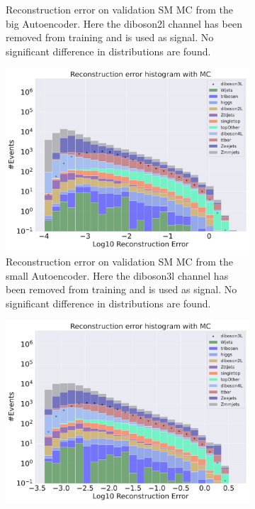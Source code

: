 \begin{figure}[H]
\begin{subfigure}{.45\textwidth}
        \caption{Reconstruction error on validation SM MC from the big Autoencoder. Here the diboson2l channel has been removed from training and 
        is used as signal. No significant difference in distributions are found. }
        \label{fig:ae_big_diboson2l}
    \end{subfigure}
    \hfill 
    \begin{subfigure}{.45\textwidth}
        \includegraphics[width=\textwidth]{Figures/AE_testing/small/b_data_recon_big_rm3_feats_sig_diboson3l.pdf}
        \caption{Reconstruction error on validation SM MC from the small Autoencoder. Here the diboson3l channel has been removed from training and 
        is used as signal. No significant difference in distributions are found. }
        \label{fig:ae_small_diboson3l}
    \end{subfigure}
    \hfill
    \begin{subfigure}{.45\textwidth}
        \includegraphics[width=\textwidth]{Figures/AE_testing/big/b_data_recon_big_rm3_feats_sig_diboson3l.pdf}

\end{subfigure}
\end{figure}
